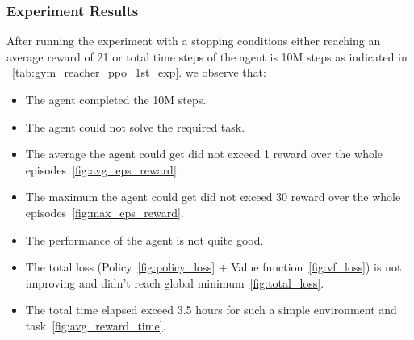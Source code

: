 \subsubsection{Experiment Results}

After running the experiment with a stopping conditions either reaching an average reward of 21 or total time steps of the agent is 10M steps as indicated in ~\ref{tab:gym_reacher_ppo_1st_exp}.
we observe that:

\begin{itemize}
    \item The agent completed the 10M steps.
    \item The agent could not solve the required task.
    \item The average the agent could get did not exceed 1 reward over the whole episodes~\ref{fig:avg_eps_reward}.
    \item The maximum the agent could get did not exceed 30 reward over the whole episodes~\ref{fig:max_eps_reward}.
    \item The performance of the agent is not quite good.
    \item The total loss (Policy~\ref{fig:policy_loss} + Value function~\ref{fig:vf_loss}) is not improving and didn't reach global minimum~\ref{fig:total_loss}.
    \item The total time elapsed exceed 3.5 hours for such a simple environment and task~\ref{fig:avg_reward_time}.
\end{itemize}

